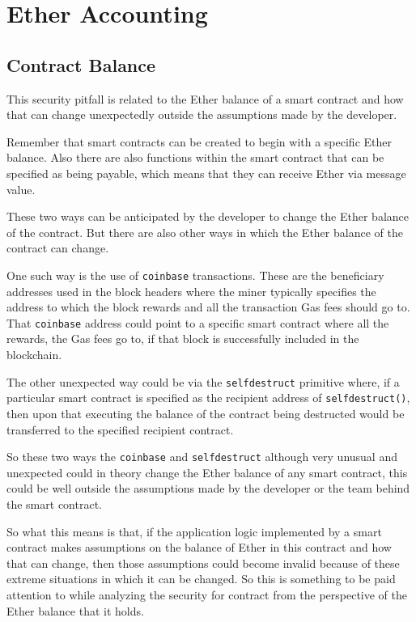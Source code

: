 \section{Ether Accounting}\label{ether-accounting}

\subsection{Contract Balance}\label{contract-balance}

This security pitfall is related to the Ether balance of a smart
contract and how that can change unexpectedly outside the assumptions
made by the developer.

Remember that smart contracts can be created to begin with a specific
Ether balance. Also there are also functions within the smart contract
that can be specified as being payable, which means that they can
receive Ether via message value.

These two ways can be anticipated by the developer to change the Ether
balance of the contract. But there are also other ways in which the
Ether balance of the contract can change.

One such way is the use of \texttt{coinbase} transactions. These are the
beneficiary addresses used in the block headers where the miner
typically specifies the address to which the block rewards and all the
transaction Gas fees should go to. That \texttt{coinbase} address could
point to a specific smart contract where all the rewards, the Gas fees
go to, if that block is successfully included in the blockchain.

The other unexpected way could be via the \texttt{selfdestruct}
primitive where, if a particular smart contract is specified as the
recipient address of \texttt{selfdestruct()}, then upon that executing
the balance of the contract being destructed would be transferred to the
specified recipient contract.

So these two ways the \texttt{coinbase} and \texttt{selfdestruct}
although very unusual and unexpected could in theory change the Ether
balance of any smart contract, this could be well outside the
assumptions made by the developer or the team behind the smart contract.

So what this means is that, if the application logic implemented by a
smart contract makes assumptions on the balance of Ether in this
contract and how that can change, then those assumptions could become
invalid because of these extreme situations in which it can be changed.
So this is something to be paid attention to while analyzing the
security for contract from the perspective of the Ether balance that it
holds.

